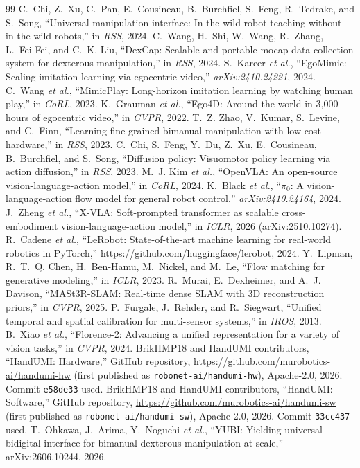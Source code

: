 \documentclass[conference,10pt]{IEEEtran}
\begin{document}
\begin{thebibliography}{99}\footnotesize
{} C.~Chi, Z.~Xu, C.~Pan, E.~Cousineau, B.~Burchfiel, S.~Feng, R.~Tedrake, and S.~Song, ``Universal manipulation interface: In-the-wild robot teaching without in-the-wild robots,'' in \emph{RSS}, 2024.
 C.~Wang, H.~Shi, W.~Wang, R.~Zhang, L.~Fei-Fei, and C.~K. Liu, ``DexCap: Scalable and portable mocap data collection system for dexterous manipulation,'' in \emph{RSS}, 2024.
 S.~Kareer \emph{et al.}, ``EgoMimic: Scaling imitation learning via egocentric video,'' \emph{arXiv:2410.24221}, 2024.
 C.~Wang \emph{et al.}, ``MimicPlay: Long-horizon imitation learning by watching human play,'' in \emph{CoRL}, 2023.
 K.~Grauman \emph{et al.}, ``Ego4D: Around the world in 3,000 hours of egocentric video,'' in \emph{CVPR}, 2022.
 T.~Z. Zhao, V.~Kumar, S.~Levine, and C.~Finn, ``Learning fine-grained bimanual manipulation with low-cost hardware,'' in \emph{RSS}, 2023.
 C.~Chi, S.~Feng, Y.~Du, Z.~Xu, E.~Cousineau, B.~Burchfiel, and S.~Song, ``Diffusion policy: Visuomotor policy learning via action diffusion,'' in \emph{RSS}, 2023.
 M.~J. Kim \emph{et al.}, ``OpenVLA: An open-source vision-language-action model,'' in \emph{CoRL}, 2024.
 K.~Black \emph{et al.}, ``$\pi_0$: A vision-language-action flow model for general robot control,'' \emph{arXiv:2410.24164}, 2024.
 J.~Zheng \emph{et al.}, ``X-VLA: Soft-prompted transformer as scalable cross-embodiment vision-language-action model,'' in \emph{ICLR}, 2026 (arXiv:2510.10274).
 R.~Cadene \emph{et al.}, ``LeRobot: State-of-the-art machine learning for real-world robotics in PyTorch,'' \url{https://github.com/huggingface/lerobot}, 2024.
 Y.~Lipman, R.~T.~Q. Chen, H.~Ben-Hamu, M.~Nickel, and M.~Le, ``Flow matching for generative modeling,'' in \emph{ICLR}, 2023.
 R.~Murai, E.~Dexheimer, and A.~J. Davison, ``MASt3R-SLAM: Real-time dense SLAM with 3D reconstruction priors,'' in \emph{CVPR}, 2025.
 P.~Furgale, J.~Rehder, and R.~Siegwart, ``Unified temporal and spatial calibration for multi-sensor systems,'' in \emph{IROS}, 2013.
 B.~Xiao \emph{et al.}, ``Florence-2: Advancing a unified representation for a variety of vision tasks,'' in \emph{CVPR}, 2024.
 BrikHMP18 and HandUMI contributors, ``HandUMI: Hardware,'' GitHub repository, \url{https://github.com/murobotics-ai/handumi-hw} (first published as \texttt{robonet-ai/handumi-hw}), Apache-2.0, 2026. Commit \texttt{e58de33} used.
 BrikHMP18 and HandUMI contributors, ``HandUMI: Software,'' GitHub repository, \url{https://github.com/murobotics-ai/handumi-sw} (first published as \texttt{robonet-ai/handumi-sw}), Apache-2.0, 2026. Commit \texttt{33cc437} used.
 T.~Ohkawa, J.~Arima, Y.~Noguchi \emph{et al.}, ``YUBI: Yielding universal bidigital interface for bimanual dexterous manipulation at scale,'' arXiv:2606.10244, 2026.
\end{thebibliography}
\end{document}
